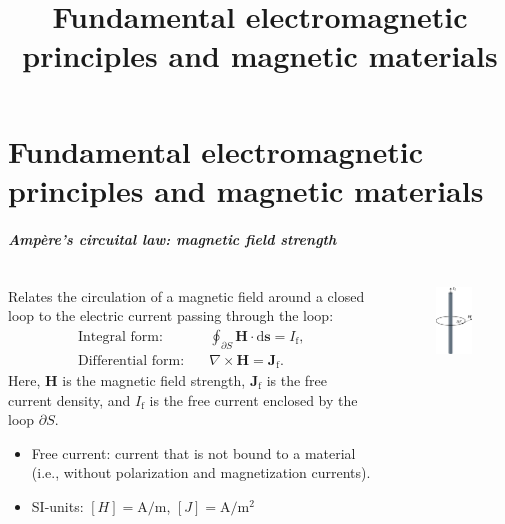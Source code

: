 \part{Fundamental electromagnetic principles and magnetic materials}
\title[Electromagnetic and material fundamentals]{Fundamental electromagnetic principles and magnetic materials}  
\date{}  
\frame{\titlepage} 

\begin{frame}
	\frametitle{Amp\`ere's circuital law: magnetic field strength}
	\begin{columns}
		\begin{column}{0.55\textwidth}
			Relates the circulation of a magnetic field around a closed loop to the electric current passing through the loop:
            \begin{align}
                \mbox{Integral form:} \quad &\oint_{\partial S} \bm{H} \cdot \mathrm{d}\bm{s} = I_{\mathrm{f}},\\
                \mbox{Differential form:} \quad &\nabla \times \bm{H} = \bm{J}_{\mathrm{f}}. 
                \label{eq:ampere_law}
            \end{align}
            Here, $\bm{H}$ is the magnetic field strength, $\bm{J}_{\mathrm{f}}$ is the free current density, and $I_{\mathrm{f}}$ is the free current enclosed by the loop $\partial S$. 
            \vspace{0.25cm}
            \begin{itemize}
                \item Free current: current that is not bound to a material (i.e., without polarization and magnetization currents).
                \item SI-units: $[H] = \si{\ampere\per\metre}$, $[J] = \si{\ampere\per\metre\squared}$
            \end{itemize}
		\end{column}
        \hfill
		\begin{column}{0.4\textwidth}
			\begin{figure}
				\centering
				\includegraphics[height=0.7\textheight]{fig/lec02/Magnetic_field_strength_simple_conductor.pdf}

\end{figure}
\end{column}
\end{columns}
\end{frame}
